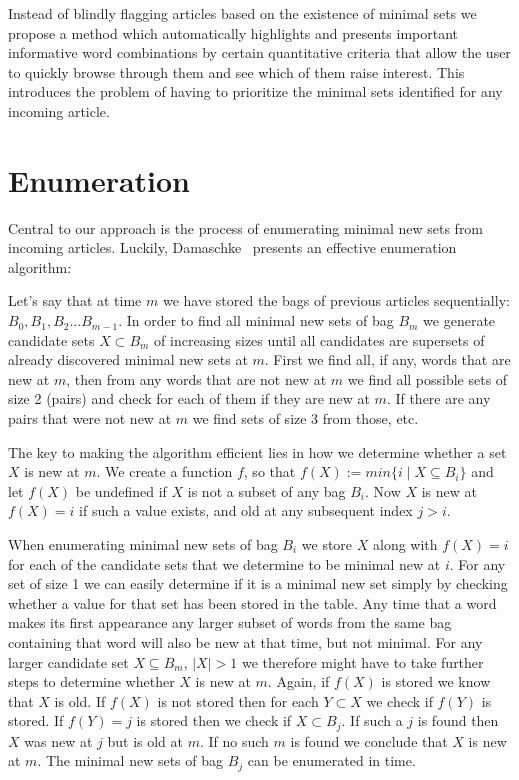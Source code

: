 Instead of blindly flagging articles based on the existence of minimal sets we propose a method which automatically highlights and presents important informative word combinations by certain quantitative criteria that allow the user to quickly browse through them and see which of them raise interest. This introduces the problem of having to prioritize the minimal sets identified for any incoming article.

\section{Enumeration}
\label{method:enumeration}
Central to our approach is the process of enumerating minimal new sets from incoming articles. Luckily, Damaschke~\cite{damaschke2015pairs} presents an effective enumeration algorithm:

Let's say that at time $m$ we have stored the bags of previous articles sequentially: $B_0, B_1, B_2...B_{m-1}$. In order to find all minimal new sets of bag $B_{m}$ we generate candidate sets $X \subset B_{m}$ of increasing sizes until all candidates are supersets of already discovered minimal new sets at $m$. First we find all, if any, words that are new at $m$, then from any words that are not new at $m$ we find all possible sets of size 2 (pairs) and check for each of them if they are new at $m$. If there are any pairs that were not new at $m$ we find sets of size 3 from those, etc. 

The key to making the algorithm efficient lies in how we determine whether a set $X$ is new at $m$. We create a function $f$, so that $f(X) := min\{i \mid X \subseteq B_{i}\}$ and let $f(X)$ be undefined if $X$ is not a subset of any bag $B_{i}$. Now $X$ is new at $f(X)=i$ if such a value exists, and old at any subsequent index $j>i$. 

When enumerating minimal new sets of bag $B_{i}$ we store $X$ along with $f(X)=i$ for each of the candidate sets that we determine to be minimal new at $i$. For any set of size 1 we can easily determine if it is a minimal new set simply by checking whether a value for that set has been stored in the table.  Any time that a word makes its first appearance any larger subset of words from the same bag containing that word will also be new at that time, but not minimal. For any larger candidate set $X \subseteq B_{m}$, $|X|>1$ we therefore might have to take further steps to determine whether $X$ is new at $m$. Again, if $f(X)$ is stored we know that $X$ is old. If $f(X)$ is not stored then for each $Y \subset X$ we check if $f(Y)$ is stored. If $f(Y)=j$ is stored then we check if $X \subset B_{j}$. If such a $j$ is found then $X$ was new at $j$ but is old at $m$. If no such $m$ is found we conclude that $X$ is new at $m$. The minimal new sets of bag $B_{j}$ can be enumerated in  time.


